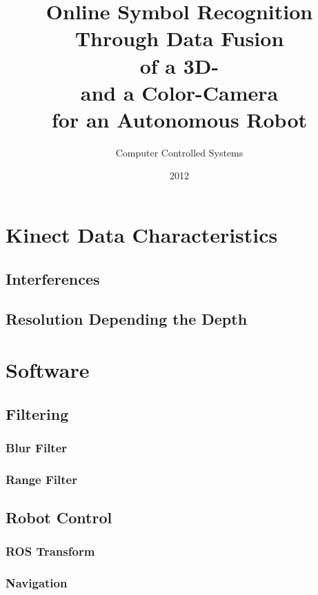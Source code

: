 \documentclass[oneside]{Ausarbeitung}
\title{Online Symbol Recognition \\ Through Data Fusion \\ of a 3D- \\ and a
Color-Camera \\ for an Autonomous Robot}
\subtitle{Computer Controlled Systems}
\date{2012}
\begin{document}
\maketitle 
 
 
 
\tableofcontents

\listoffigures

\listoftables 








\chapter{Kinect Data Characteristics}

\section{Interferences}
\section{Resolution Depending the Depth}

\chapter{Software}
\section{Filtering}
\subsection{Blur Filter}
\subsection{Range Filter}
\section{Robot Control}
\subsection{ROS Transform}
\subsection{Navigation}
\end{document}
